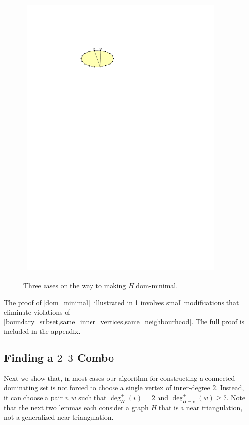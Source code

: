 \documentclass[a4paper,UKenglish,cleveref, autoref, thm-restate]{lipics-v2021}
\begin{document}
\begin{figure}
\begin{tabular}{ccc}
    \includegraphics[page=6]{figs/minimal}
  \end{tabular}
  \caption{Three cases on the way to making $H$ dom-minimal.}
  \label{minimal_fig}
\end{figure}
The proof of \cref{dom_minimal}, illustrated in \cref{minimal_fig} involves small modifications that eliminate violations of \cref{boundary_subset,same_inner_vertices,same_neighbourhood}.  The full proof is included in the appendix.


\subsection{Finding a $2$--$3$ Combo}
\label{combo}

Next we show that, in most cases our algorithm for constructing a connected dominating set is not forced to choose a single vertex of inner-degree $2$. Instead, it can choose a pair $v,w$ such that $\deg^+_H(v)=2$ and $\deg^+_{H-v}(w)\ge 3$. Note that the next two lemmas each consider a graph $H$ that is a near triangulation, not a generalized near-triangulation.
\end{document}
